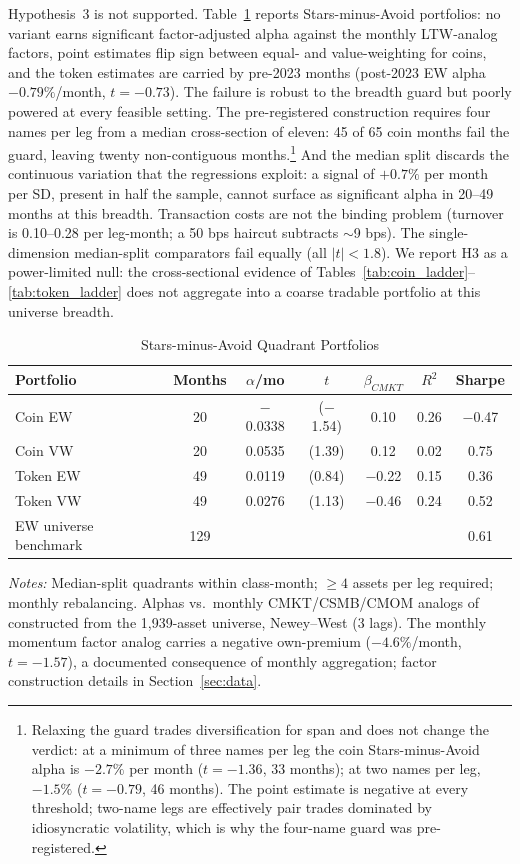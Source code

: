 \documentclass[12pt]{article}
\begin{document}
Hypothesis~3 is not supported. Table~\ref{tab:quadrant} reports Stars-minus-Avoid
portfolios: no variant earns significant factor-adjusted alpha against the monthly
LTW-analog factors, point estimates flip sign between equal- and value-weighting for
coins, and the token estimates are carried by pre-2023 months (post-2023 EW alpha
$-0.79\%$/month, $t=-0.73$). The failure is robust to the breadth guard but
poorly powered at every feasible setting. The pre-registered construction requires four
names per leg from a median cross-section of eleven: 45 of 65 coin months fail the
guard, leaving twenty non-contiguous months.\footnote{Relaxing the guard trades
diversification for span and does not change the verdict: at a minimum of three names
per leg the coin Stars-minus-Avoid alpha is $-2.7\%$ per month ($t=-1.36$, 33 months);
at two names per leg, $-1.5\%$ ($t=-0.79$, 46 months). The point estimate is negative
at every threshold; two-name legs are effectively pair trades dominated by
idiosyncratic volatility, which is why the four-name guard was pre-registered.} And the median split discards the continuous variation that the regressions
exploit: a signal of $+0.7\%$ per month per SD, present in half the sample, cannot
surface as significant alpha in 20--49 months at this breadth. Transaction costs are
not the binding problem (turnover is 0.10--0.28 per leg-month; a 50 bps haircut
subtracts $\sim$9 bps). The single-dimension median-split comparators fail equally
(all $|t|<1.8$). We report H3 as a power-limited null: the cross-sectional evidence
of Tables~\ref{tab:coin_ladder}--\ref{tab:token_ladder} does not aggregate into a
coarse tradable portfolio at this universe breadth.

\begin{table}[ht]
\centering
\caption{Stars-minus-Avoid Quadrant Portfolios}
\label{tab:quadrant}
\small
\begin{tabular}{lcccccc}
\toprule
Portfolio & Months & $\alpha$/mo & $t$ & $\beta_{CMKT}$ & $R^2$ & Sharpe \\
\midrule
Coin EW & 20 & $-$0.0338 & ($-$1.54) & 0.10 & 0.26 & $-$0.47 \\
Coin VW & 20 & 0.0535 & (1.39) & 0.12 & 0.02 & 0.75 \\
Token EW & 49 & 0.0119 & (0.84) & $-$0.22 & 0.15 & 0.36 \\
Token VW & 49 & 0.0276 & (1.13) & $-$0.46 & 0.24 & 0.52 \\
\midrule
EW universe benchmark & 129 & & & & & 0.61 \\
\bottomrule
\end{tabular}
\smallskip

\parbox{0.92\linewidth}{\footnotesize
\textit{Notes:} Median-split quadrants within class-month; $\geq 4$ assets per leg
required; monthly rebalancing. Alphas vs.\ monthly CMKT/CSMB/CMOM analogs of
\citet{liu2022common} constructed from the 1,939-asset universe, Newey--West (3 lags).
The monthly momentum factor analog carries a negative own-premium ($-4.6\%$/month,
$t=-1.57$), a documented consequence of monthly aggregation; factor construction
details in Section~\ref{sec:data}.}
\end{table}
\end{document}
